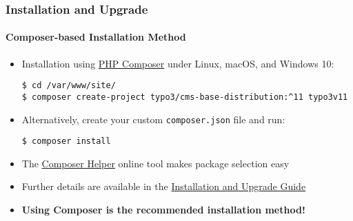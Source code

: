 %

\begin{frame}[fragile]
	\frametitle{Installation and Upgrade}
	\framesubtitle{Composer-based Installation Method}


	\begin{itemize}
		\item Installation using \href{https://getcomposer.org}{PHP Composer} under Linux, macOS, and Windows 10:
\begin{lstlisting}
$ cd /var/www/site/
$ composer create-project typo3/cms-base-distribution:^11 typo3v11
\end{lstlisting}

		\item Alternatively, create your custom \texttt{composer.json} file and run:
\begin{lstlisting}
$ composer install
\end{lstlisting}

		\item The \href{https://get.typo3.org/misc/composer/helper}{Composer Helper}
			online tool makes package selection easy

		\item Further details are available in the
			\href{https://docs.typo3.org/m/typo3/guide-installation/master/en-us/}{Installation and Upgrade Guide}

		\item \textbf{Using Composer is the recommended installation method!}

	\end{itemize}
\end{frame}

